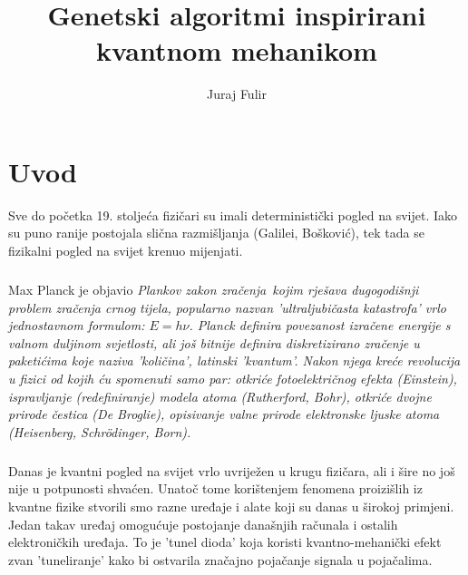 \documentclass[times, utf8, zavrsni]{fer}
\begin{document}
\title{Genetski algoritmi inspirirani kvantnom mehanikom}
\author{Juraj Fulir}
\maketitle

\izvornik


\tableofcontents

\chapter{Uvod}
Sve do početka 19. stoljeća fizičari su imali deterministički pogled na svijet. Iako su puno ranije postojala slična razmišljanja (Galilei, Bošković), tek tada se fizikalni pogled na svijet krenuo mijenjati. 

\paragraph{}
Max Planck je objavio \it Plankov zakon zračenja\rm\ kojim rješava dugogodišnji problem zračenja crnog tijela, popularno nazvan '\it ultraljubičasta katastrofa\rm' vrlo jednostavnom formulom: $E = h\nu$. Planck definira povezanost izračene energije s valnom duljinom svjetlosti, ali još bitnije definira diskretizirano zračenje u paketićima koje naziva 'količina', latinski 'kvantum'. Nakon njega kreće revolucija u fizici od kojih ću spomenuti samo par: otkriće fotoelektričnog efekta (Einstein), ispravljanje (redefiniranje) modela atoma (Rutherford, Bohr), otkriće dvojne prirode čestica (De Broglie), opisivanje valne prirode elektronske ljuske atoma (Heisenberg, Schr\"odinger, Born).

\paragraph{}
Danas je kvantni pogled na svijet vrlo uvriježen u krugu fizičara, ali i šire no još nije u potpunosti shvaćen. Unatoč tome korištenjem fenomena proizišlih iz kvantne fizike stvorili smo razne uređaje i alate koji su danas u širokoj primjeni. Jedan takav uređaj omogućuje postojanje današnjih računala i ostalih elektroničkih uređaja. To je 'tunel dioda' koja koristi kvantno-mehanički efekt zvan 'tuneliranje' kako bi ostvarila značajno pojačanje signala u pojačalima.
\end{document}

